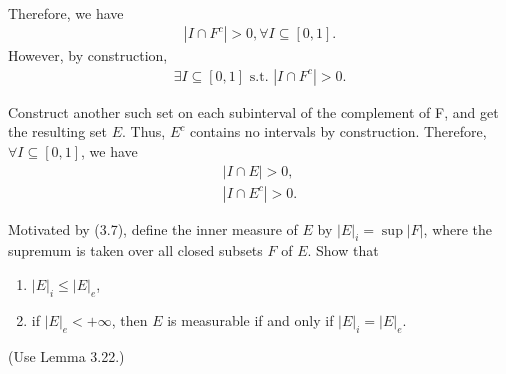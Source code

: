 \documentclass[UTF8,a4paper,10pt]{article}
\begin{document}
\begin{solution}\,

Therefore, we have
\begin{equation*}
  \begin{aligned}
    |I\cap F^c| > 0,  \forall I\subseteq[0,1] .
  \end{aligned}
\end{equation*}
However, by construction,
\begin{equation*}
  \begin{aligned}
    \exists I\subseteq[0,1]\text{ s.t. }|I\cap F^c| > 0.
  \end{aligned}
\end{equation*}

Construct another such set on each subinterval of the complement of F, and get the resulting set \(E\). Thus, \(E^c\) contains no intervals by construction. Therefore, \(\forall I\subseteq[0,1]\), we have
\begin{equation*}
  \begin{aligned}
    |I\cap E| > 0,\\
    |I\cap E^c| > 0.
  \end{aligned}
\end{equation*}

\end{solution}


\begin{Problem}[]{}
  Motivated by (3.7), define the inner measure of $E$ by $|E|_i = \sup |F|$, where
  the supremum is taken over all closed subsets $F$ of $E$. Show that
  \begin{enumerate}
    \item $|E|_i \leq |E|_e$,
    \item if $|E|_e < +\infty$, then $E$ is measurable if and only if $|E|_i = |E|_e$.
  \end{enumerate}
  (Use Lemma 3.22.)

\end{Problem}
\end{document}
